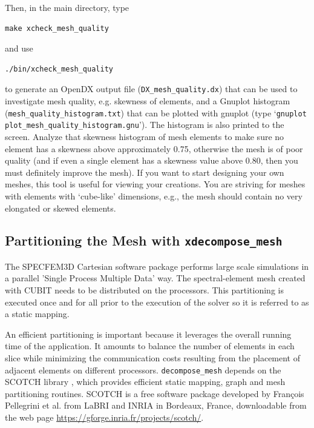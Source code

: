 \noindent
Then, in the main directory, type
{\small
\begin{verbatim}
make xcheck_mesh_quality
\end{verbatim}
}
and use
{\small
\begin{verbatim}
./bin/xcheck_mesh_quality
\end{verbatim}
}
to generate an %
OpenDX output file (\texttt{\small DX\_mesh\_quality.dx}{\small )
that can be used to investigate mesh quality, e.g. skewness of elements,
and a Gnuplot histogram (}\texttt{\small mesh\_quality\_histogram.txt}{\small )
that can be plotted with gnuplot (type `}\texttt{\small gnuplot plot\_mesh\_quality\_histogram.gnu}{\small ').
The histogram is also printed to the screen. Analyze that skewness
histogram of mesh elements to make sure no element has a skewness
above approximately 0.75, otherwise the mesh is of poor quality (and
if even a single element has a skewness value above 0.80, then you
must definitely improve the mesh). If you want to start designing
your own meshes, this tool is useful for viewing your creations. You
are striving for meshes with elements with `cube-like' dimensions,
e.g., the mesh should contain no very elongated or skewed elements.}{\small \par}


\subsection{Partitioning the Mesh with \texttt{xdecompose\_mesh}}

The SPECFEM3D Cartesian software package performs large scale simulations
in a parallel 'Single Process Multiple Data' way. The spectral-element
mesh created with CUBIT needs to be distributed on the processors.
This partitioning is executed once and for all prior to the execution
of the solver so it is referred to as a static mapping.

An efficient partitioning is important because it leverages the overall
running time of the application. It amounts to balance the number
of elements in each slice while minimizing the communication costs
resulting from the placement of adjacent elements on different processors.
\texttt{decompose\_mesh} depends on the SCOTCH library \citep{PeRo96},
which provides efficient static mapping, graph and mesh partitioning
routines. SCOTCH is a free software package developed by Fran\c{c}ois
Pellegrini et al. from LaBRI and INRIA in Bordeaux, France, downloadable
from the web page \url{https://gforge.inria.fr/projects/scotch/}.\\


